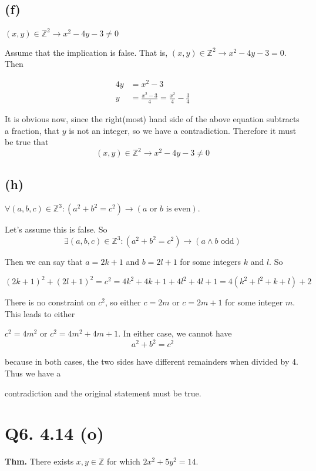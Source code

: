 \documentclass{article}
\begin{document}
\subsection*{(f)} $(x,y) \in \mathbb{Z}^2 \rightarrow x^2 - 4y - 3 \neq 0$

Assume that the implication is false. That is, $(x,y) \in \mathbb{Z}^2 \rightarrow x^2 -4y -3 = 0$. Then 

\begin{align*}
4y &= x^2 - 3 \\
y &= \frac{x^2 - 3}{4} = \frac{x^2}{4} - \frac{3}{4}
\end{align*}

It is obvious now, since the right(most) hand side of the above equation subtracts a fraction, that $y$ is not an integer, so we have a contradiction. Therefore it must be true that $$(x,y) \in \mathbb{Z}^2 \rightarrow x^2 - 4y - 3 \neq 0$$

\subsection*{(h)} $\forall (a, b, c) \in \mathbb{Z}^3 : (a^2 + b^2 = c^2) \rightarrow (a \text{ or } b \text{ is even})$.

Let's assume this is false. So $$\exists (a, b, c) \in \mathbb{Z}^3 : (a^2 + b^2 = c^2) \rightarrow (a \wedge b \text{ odd})$$

Then we can say that $a = 2k + 1$ and $b = 2l + 1$ for some integers $k$ and $l$. So 

$$(2k+1)^2 + (2l+1)^2 = c^2 = 4k^2 + 4k + 1 + 4l^2 + 4l + 1 = 4(k^2 + l^2 + k+l) + 2$$

There is no constraint on $c^2$, so either $c = 2m$ or $c = 2m+1$ for some integer $m$. This leads to either 

$c^2 = 4m^2$ or $c^2 = 4m^2 + 4m +1$. In either case, we cannot have $$a^2 + b^2 = c^2$$

because in both cases, the two sides have different remainders when divided by 4. Thus we have a

contradiction and the original statement must be true.




\section*{Q6. 4.14 (o)}

\textbf{Thm.} There exists $x,y \in \mathbb{Z}$ for which $2x^2 +5y^2 = 14$.
\end{document}

